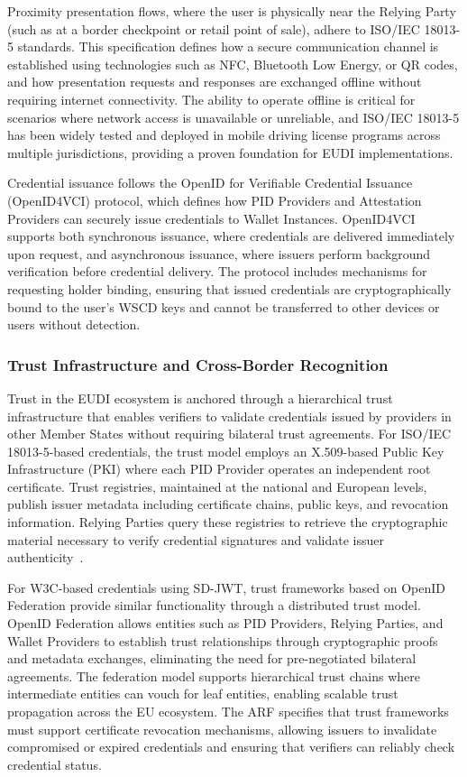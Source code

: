 \documentclass[sigconf,balance,nonacm,authordraft]{acmart}
\begin{document}
Proximity presentation flows, where the user is physically near the Relying Party (such as at a border checkpoint or retail point of sale), adhere to ISO/IEC 18013-5 standards. This specification defines how a secure communication channel is established using technologies such as NFC, Bluetooth Low Energy, or QR codes, and how presentation requests and responses are exchanged offline without requiring internet connectivity. The ability to operate offline is critical for scenarios where network access is unavailable or unreliable, and ISO/IEC 18013-5 has been widely tested and deployed in mobile driving license programs across multiple jurisdictions, providing a proven foundation for EUDI implementations.

Credential issuance follows the OpenID for Verifiable Credential Issuance (OpenID4VCI) protocol, which defines how PID Providers and Attestation Providers can securely issue credentials to Wallet Instances. OpenID4VCI supports both synchronous issuance, where credentials are delivered immediately upon request, and asynchronous issuance, where issuers perform background verification before credential delivery. The protocol includes mechanisms for requesting holder binding, ensuring that issued credentials are cryptographically bound to the user's WSCD keys and cannot be transferred to other devices or users without detection.

\subsubsection{Trust Infrastructure and Cross-Border Recognition}

Trust in the EUDI ecosystem is anchored through a hierarchical trust infrastructure that enables verifiers to validate credentials issued by providers in other Member States without requiring bilateral trust agreements. For ISO/IEC 18013-5-based credentials, the trust model employs an X.509-based Public Key Infrastructure (PKI) where each PID Provider operates an independent root certificate. Trust registries, maintained at the national and European levels, publish issuer metadata including certificate chains, public keys, and revocation information. Relying Parties query these registries to retrieve the cryptographic material necessary to verify credential signatures and validate issuer authenticity~\cite{PortoThesis_Structure,Finextra_SSI_Components}.

For W3C-based credentials using SD-JWT, trust frameworks based on OpenID Federation provide similar functionality through a distributed trust model. OpenID Federation allows entities such as PID Providers, Relying Parties, and Wallet Providers to establish trust relationships through cryptographic proofs and metadata exchanges, eliminating the need for pre-negotiated bilateral agreements. The federation model supports hierarchical trust chains where intermediate entities can vouch for leaf entities, enabling scalable trust propagation across the EU ecosystem. The ARF specifies that trust frameworks must support certificate revocation mechanisms, allowing issuers to invalidate compromised or expired credentials and ensuring that verifiers can reliably check credential status.
\end{document}

